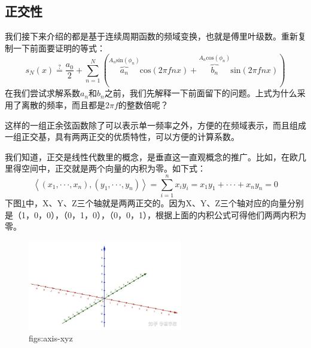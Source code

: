 \documentclass[lang=cn,11pt,a4paper,cite=numbers]{elegantpaper}
\begin{document}
\subsection{正交性}
  我们接下来介绍的都是基于连续周期函数的频域变换，也就是傅里叶级数。重新复制一下前面要证明的等式：
\begin{equation}
  s_{N}(x)\overset{?}{=}\frac{a_{0}}{2}+\sum_{n=1}^{N}\left(\overbrace{a_{n}}^{A_{n}\mathrm{sin}(\phi_{n})}\mathrm{cos}(2{\pi}fnx)+\overbrace{b_{n}}^{A_{n}\mathrm{cos}(\phi_{n})}\mathrm{sin}(2{\pi}fnx)\right)
\end{equation}
在我们尝试求解系数$a_{n}$和$b_{n}$之前，我们先解释一下前面留下的问题。上式为什么采用了离散的频率，而且都是$2{\pi}f$的整数倍呢？

  这样的一组正余弦函数除了可以表示单一频率之外，方便的在频域表示，而且组成一组正交基，具有两两正交的优质特性，可以方便的计算系数。

  我们知道，正交是线性代数里的概念，是垂直这一直观概念的推广。比如，在欧几里得空间中，正交就是两个向量的内积为零。如下式：
\begin{equation}
  \left\langle(x_{1},\cdot\cdot\cdot,x_{n}),(y_{1},\cdot\cdot\cdot,y_{n})\right\rangle=\sum_{i=1}^{n}x_{i}y_{i}=x_{1}y_{1}+\cdot\cdot\cdot+x_{n}y_{n}=0
\end{equation}
  下图\ref{figs:axis-xyz}中，X、Y、Z三个轴就是两两正交的。因为X、Y、Z三个轴对应的向量分别是（1，0，0），（0，1，0），（0，0，1），根据上面的内积公式可得他们两两内积为零。
\begin{figure}[!htb]
  \centering
  \includegraphics[width=0.6\textwidth]{figs/axis-xyz.png}
  \caption{figs:axis-xyz}
  \label{figs:axis-xyz}
\end{figure}
\end{document}
